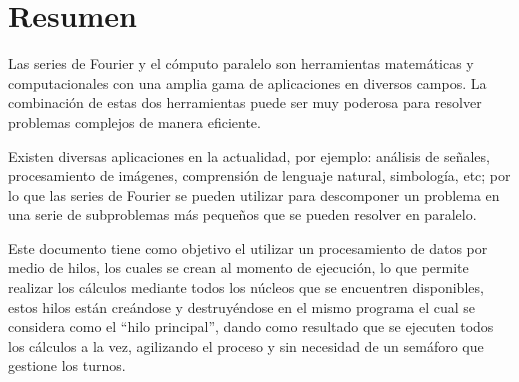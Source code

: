\section*{Resumen}

Las series de Fourier y el cómputo paralelo son herramientas matemáticas y computacionales con una amplia gama de aplicaciones en diversos campos. La combinación de estas dos herramientas puede ser muy poderosa para resolver problemas complejos de manera eficiente.

Existen diversas aplicaciones en la actualidad, por ejemplo: análisis de señales, procesamiento de imágenes, comprensión de lenguaje natural, simbología, etc; por lo que las series de Fourier se pueden utilizar para descomponer un problema en una serie de subproblemas más pequeños que se pueden resolver en paralelo.

Este documento tiene como objetivo el utilizar un procesamiento de datos por medio de hilos, los cuales se crean al momento de ejecución, lo que permite realizar los cálculos mediante todos los núcleos que se encuentren disponibles, estos hilos están creándose y destruyéndose en el mismo programa el cual se considera como el ``hilo principal'', dando como resultado que se ejecuten todos los cálculos a la vez, agilizando el proceso y sin necesidad de un semáforo que gestione los turnos.
